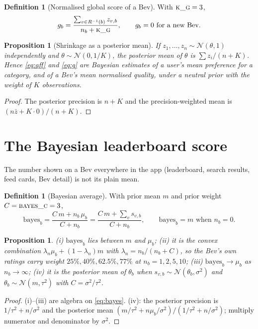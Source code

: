 \documentclass[11pt]{article}
\theoremstyle{plain}
\newtheorem{proposition}[theorem]{Proposition}
\theoremstyle{definition}
\newtheorem{definition}[theorem]{Definition}
\theoremstyle{remark}
\begin{document}
\begin{definition}[Normalised global score of a Bev]\label{def:g}
With $\textsc{k\_g} = 3$,
\begin{equation}\label{eq:g}
g_b = \frac{\sum_{v \in R^{-1}(b)} z_{v,b}}{n_b + \textsc{k\_g}}, \qquad g_b = 0 \text{ for a new Bev.}
\end{equation}
\end{definition}

\begin{proposition}[Shrinkage as a posterior mean]\label{prop:shrink}
If $z_1, \dots, z_n \sim \mathcal{N}(\theta, 1)$ independently and $\theta \sim \mathcal{N}(0, 1/K)$, the posterior mean of $\theta$ is $\sum z_i / (n + K)$. Hence \eqref{eq:aff} and \eqref{eq:g} are Bayesian estimates of a user's mean preference for a category, and of a Bev's mean normalised quality, under a neutral prior with the weight of $K$ observations.
\end{proposition}
\begin{proof}
The posterior precision is $n + K$ and the precision-weighted mean is $(n \bar z + K \cdot 0)/(n + K)$.
\end{proof}

\section{The Bayesian leaderboard score}\label{sec:bayes}

The number shown on a Bev everywhere in the app (leaderboard, search results, feed cards, Bev detail) is not its plain mean.

\begin{definition}[Bayesian average]
With prior mean $m$ and prior weight $C = \textsc{bayes\_c} = 3$,
\begin{equation}\label{eq:bayes}
\mathrm{bayes}_b = \frac{C\, m + n_b\, \mu_b}{C + n_b} = \frac{C\, m + \sum_{v} s_{v,b}}{C + n_b}, \qquad \mathrm{bayes}_b = m \text{ when } n_b = 0 .
\end{equation}
\end{definition}

\begin{proposition}\label{prop:bayesprops}
(i) $\mathrm{bayes}_b$ lies between $m$ and $\mu_b$; (ii) it is the convex combination $\lambda_n \mu_b + (1 - \lambda_n) m$ with $\lambda_n = n_b/(n_b + C)$, so the Bev's own ratings carry weight $25\%, 40\%, 62.5\%, 77\%$ at $n_b = 1, 2, 5, 10$; (iii) $\mathrm{bayes}_b \to \mu_b$ as $n_b \to \infty$; (iv) it is the posterior mean of $\theta_b$ when $s_{v,b} \sim \mathcal{N}(\theta_b, \sigma^2)$ and $\theta_b \sim \mathcal{N}(m, \tau^2)$ with $C = \sigma^2/\tau^2$.
\end{proposition}
\begin{proof}
(i)--(iii) are algebra on \eqref{eq:bayes}. (iv): the posterior precision is $1/\tau^2 + n/\sigma^2$ and the posterior mean $(m/\tau^2 + n\mu_b/\sigma^2)/(1/\tau^2 + n/\sigma^2)$; multiply numerator and denominator by $\sigma^2$.
\end{proof}
\end{document}
